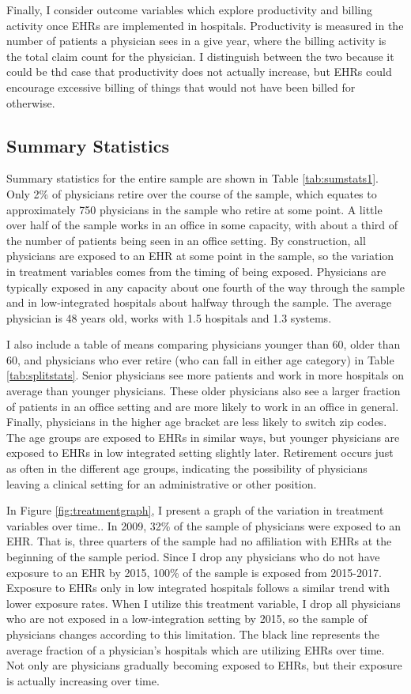 \documentclass[11pt]{article}
\begin{document}
Finally, I consider outcome variables which explore productivity and billing activity once EHRs are implemented in hospitals. Productivity is measured in the number of patients a physician sees in a give year, where the billing activity is the total claim count for the physician. I distinguish between the two because it could be thd case that productivity does not actually increase, but EHRs could encourage excessive billing of things that would not have been billed for otherwise. 

\subsection{Summary Statistics}

Summary statistics for the entire sample are shown in Table \ref{tab:sumstats1}. Only 2\% of physicians retire over the course of the sample, which equates to approximately 750 physicians in the sample who retire at some point. A little over half of the sample works in an office in some capacity, with about a third of the number of patients being seen in an office setting. By construction, all physicians are exposed to an EHR at some point in the sample, so the variation in treatment variables comes from the timing of being exposed. Physicians are typically exposed in any capacity about one fourth of the way through the sample and in low-integrated hospitals about halfway through the sample. The average physician is 48 years old, works with 1.5 hospitals and 1.3 systems. 


I also include a table of means comparing physicians younger than 60, older than 60, and physicians who ever retire (who can fall in either age category) in Table \ref{tab:splitstats}. Senior physicians see more patients and work in more hospitals on average than younger physicians. These older physicians also see a larger fraction of patients in an office setting and are more likely to work in an office in general. Finally, physicians in the higher age bracket are less likely to switch zip codes. The age groups are exposed to EHRs in similar ways, but younger physicians are exposed to EHRs in low integrated setting slightly later. Retirement occurs just as often in the different age groups, indicating the possibility of physicians leaving a clinical setting for an administrative or other position.


In Figure \ref{fig:treatmentgraph}, I present a graph of the variation in treatment variables over time.. In 2009, 32\% of the sample of physicians were exposed to an EHR. That is, three quarters of the sample had no affiliation with EHRs at the beginning of the sample period. Since I drop any physicians who do not have exposure to an EHR by 2015, 100\% of the sample is exposed from 2015-2017. Exposure to EHRs only in low integrated hospitals follows a similar trend with lower exposure rates. When I utilize this treatment variable, I drop all physicians who are not exposed in a low-integration setting by 2015, so the sample of physicians changes according to this limitation. The black line represents the average fraction of a physician's hospitals which are utilizing EHRs over time. Not only are physicians gradually becoming exposed to EHRs, but their exposure is actually increasing over time.
\end{document}
